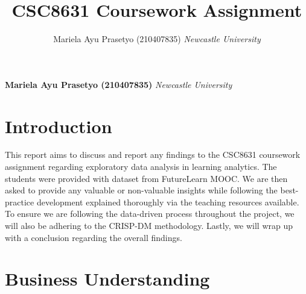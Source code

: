 \documentclass[12pt,]{article}
\title{CSC8631 Coursework Assignment  }
\author{\Large Mariela Ayu Prasetyo
(210407835)\vspace{0.05in} \newline\normalsize\emph{Newcastle
University}  }
\date{}
\newcommand*{\authorfont}{\fontfamily{phv}\selectfont}
\begin{document}
	
%    


{%
\setlength{\parindent}{0pt}
\thispagestyle{plain}
{\fontsize{18}{20}\selectfont\raggedright 
\maketitle  %

}

{
   \vskip 13.5pt\relax \normalsize\fontsize{11}{12} 
\textbf{\authorfont Mariela Ayu Prasetyo
(210407835)} \hskip 15pt \emph{\small Newcastle University}   

}

}






\vskip -8.5pt



\noindent  

\hypertarget{introduction}{%
\section{Introduction}\label{introduction}}

This report aims to discuss and report any findings to the CSC8631
coursework assignment regarding exploratory data analysis in learning
analytics. The students were provided with dataset from FutureLearn
MOOC. We are then asked to provide any valuable or non-valuable insights
while following the best-practice development explained thoroughly via
the teaching resources available. To ensure we are following the
data-driven process throughout the project, we will also be adhering to
the CRISP-DM methodology. Lastly, we will wrap up with a conclusion
regarding the overall findings.

\hypertarget{business-understanding}{%
\section{Business Understanding}\label{business-understanding}}
\end{document}
